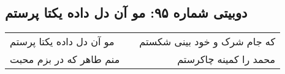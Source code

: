 \begin{center}
\section*{دوبیتی شماره ۹۵: مو آن دل داده یکتا پرستم}
\label{sec:095}
\begin{longtable}{l p{0.5cm} r}
مو آن دل داده یکتا پرستم
&&
که جام شرک و خود بینی شکستم
\\
منم طاهر که در بزم محبت
&&
محمد را کمینه چاکرستم
\\
\end{longtable}
\end{center}
